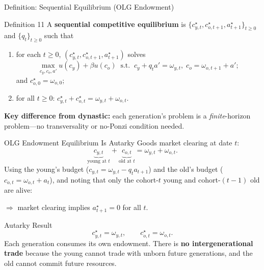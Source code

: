 \documentclass[aspectratio=169,10pt]{beamer}
\newcommand{\apxbutton}[1]{\hfill\hyperlink{#1}{\beamerbutton{Appendix}}}
\begin{document}
\begin{frame}{Definition: Sequential Equilibrium (OLG Endowment)}
\hypertarget{m-a10}{}
\begin{block}{Definition 11}
A \textbf{sequential competitive equilibrium} is $\{c_{y,t}^\star, c_{o,t+1}^\star, a_{t+1}^\star\}_{t\geq 0}$ and $\{q_t\}_{t\geq 0}$ such that
\begin{enumerate}
  \item for each $t\geq 0$, $(c_{y,t}^\star, c_{o,t+1}^\star, a_{t+1}^\star)$ solves
  \[
  \max_{c_y, c_o, a'} u(c_y)+\beta u(c_o) \;\;\text{s.t.}\;\; c_y+q_t a' = \omega_{y,t}, \; c_o = \omega_{o,t+1}+a';
  \]
  and $c_{o,0}^\star = \omega_{o,0}$;
  \item for all $t\geq 0$: $c_{y,t}^\star + c_{o,t}^\star = \omega_{y,t}+\omega_{o,t}$.
\end{enumerate}
\end{block}

\medskip
\textbf{Key difference from dynastic:} each generation's problem is a \emph{finite}-horizon problem---no transversality or no-Ponzi condition needed.
\end{frame}

\begin{frame}{OLG Endowment Equilibrium Is Autarky}
Goods market clearing at date $t$:
\[
\underbrace{c_{y,t}}_{\text{young at }t} + \underbrace{c_{o,t}}_{\text{old at }t} = \omega_{y,t}+\omega_{o,t}.
\]
Using the young's budget ($c_{y,t}=\omega_{y,t}-q_t a_{t+1}$) and the old's budget ($c_{o,t}=\omega_{o,t}+a_t$), and noting that only the cohort-$t$ young and cohort-$(t-1)$ old are alive:

\medskip
$\Rightarrow$ market clearing implies $a_{t+1}^\star=0$ for all $t$.

\begin{block}{Autarky Result}
\[
c_{y,t}^\star=\omega_{y,t}, \qquad c_{o,t}^\star=\omega_{o,t}.
\]
Each generation consumes its own endowment. There is \textbf{no intergenerational trade} because the young cannot trade with unborn future generations, and the old cannot commit future resources.
\end{block}
\apxbutton{a10}
\end{frame}
\end{document}
